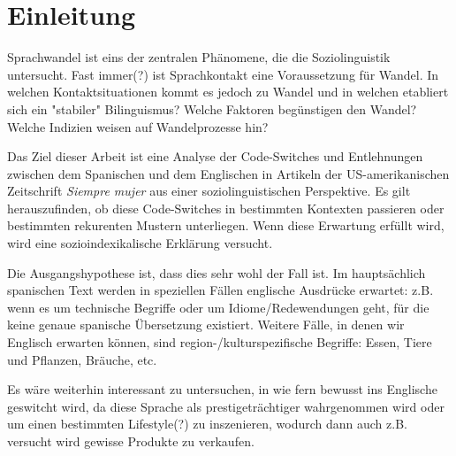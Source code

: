 \section{Einleitung}

\begin{comment}
* ca 3/4 Seiten
* Untersuchungsgegenstand
* Erkenntnisinteresse
* Forschungsstand
* Vorgehensweise: also Section 2 macht blabla, Section 3 blablup, ....
* Ergebnisse können/sollen angedeuten werden
\end{comment}



Sprachwandel ist eins der zentralen Phänomene, die die Soziolinguistik untersucht.
Fast immer(?) ist Sprachkontakt eine Voraussetzung für Wandel.
In welchen Kontaktsituationen kommt es jedoch zu Wandel und in welchen etabliert sich ein "stabiler" Bilinguismus?
Welche Faktoren begünstigen den Wandel?
Welche Indizien weisen auf Wandelprozesse hin?


Das Ziel dieser Arbeit ist eine Analyse der Code-Switches und Entlehnungen zwischen dem Spanischen und dem Englischen in Artikeln der US-amerikanischen Zeitschrift \textit{Siempre mujer} aus einer soziolinguistischen Perspektive.
Es gilt herauszufinden, ob diese Code-Switches in bestimmten Kontexten passieren oder bestimmten rekurenten Mustern unterliegen.
Wenn diese Erwartung erfüllt wird, wird eine sozioindexikalische Erklärung versucht.

Die Ausgangshypothese ist, dass dies sehr wohl der Fall ist.
Im hauptsächlich spanischen Text werden in speziellen Fällen englische Ausdrücke erwartet:
z.B. wenn es um technische Begriffe oder um Idiome/Redewendungen geht, für die keine genaue spanische Übersetzung existiert.
Weitere Fälle, in denen wir Englisch erwarten können, sind region-/kulturspezifische Begriffe: Essen, Tiere und Pflanzen, Bräuche, etc.

Es wäre weiterhin interessant zu untersuchen, in wie fern bewusst ins Englische geswitcht wird, da diese Sprache als prestigeträchtiger wahrgenommen wird oder um einen bestimmten Lifestyle(?) zu inszenieren, wodurch dann auch z.B. versucht wird gewisse Produkte zu verkaufen.


